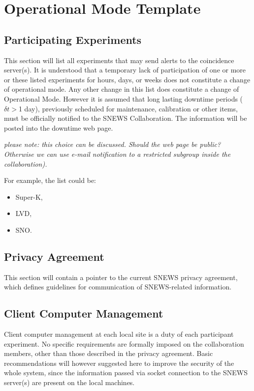 \documentclass{article}
\begin{document}
\section{Operational Mode Template}

\subsection{Participating Experiments}

This section will list all experiments that may send alerts to the
coincidence server(s).  It is understood that a temporary lack of
participation of one or more or these listed experiments for hours,
days, or weeks does not constitute a change of operational mode.  Any
other change in this list does constitute a change of Operational
Mode. However it is assumed that long lasting downtime periods
($\delta t>$1 day), previously scheduled for maintenance, calibration
or other items, must be officially notified to the SNEWS
Collaboration. The information will be posted into the downtime web
page.

{\it please note: this choice can be discussed. Should the web page be public? 
Otherwise we can use e-mail notification to a restricted  subgroup inside the 
collaboration).}

 For example, the list could be:

\begin{itemize}
\item Super-K,
\item LVD,
\item SNO.
\end{itemize}

\subsection{Privacy Agreement}
This section will contain a pointer to the current SNEWS privacy
agreement, which defines guidelines for communication
of SNEWS-related information.

\subsection{Client Computer Management}

Client computer management at each local site is a duty of each
participant experiment. No specific requirements are formally imposed
on the collaboration members, other than those
described in the privacy agreement. Basic recommendations will however
suggested here to improve the security of the whole system, since the
information passed via socket connection to the SNEWS server(s) are
present on the local machines.
\end{document}

